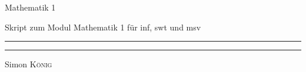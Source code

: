 \documentclass[a4paper, oneside]{report}
\begin{document}
\thispagestyle{empty}
\begin{center}


  {\Huge Mathematik 1}\\

  {\vspace{1em} \color{gray} Skript zum Modul Mathematik 1 für inf, swt und msv
  \color{darkgray}\rule{0.8\textwidth}{0.7pt}
  }


    \vfill


  {\tiny\color{darkgray}\rule{0.5\textwidth}{0.5pt}
  \vspace{0.5em}

  \small Simon \textsc{König}}
\end{center}

\tableofcontents



\end{document}
